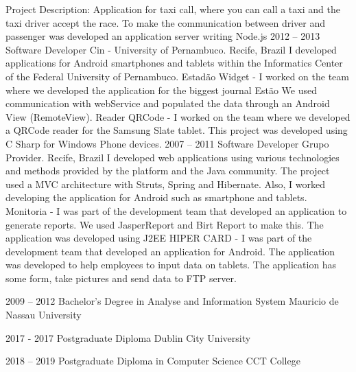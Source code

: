 \documentclass[9pt]{developercv} %
\begin{document}
\begin{entrylist}
{Project Description:
Application for taxi call, where you can call a taxi and the taxi driver accept the race. To make the communication between driver and passenger was developed an application server writing Node.js}
\entry
		{2012 -- 2013}
		{Software Developer}
		{Cin - University of Pernambuco. Recife, Brazil}
		{I developed applications for Android smartphones and tablets within the Informatics Center of the Federal University of Pernambuco.
\newline
\newline
Estadão Widget - I worked on the team where we developed the application for the biggest journal Estão We used communication with webService and populated the data through an Android View (RemoteView).
\newline
\newline
Reader QRCode - I worked on the team where we developed a QRCode reader for the Samsung Slate tablet. This project was developed using C Sharp for Windows Phone devices.}
\entry
		{2007 -- 2011}
		{Software Developer}
		{Grupo Provider. Recife, Brazil}
		{I developed web applications using various technologies and methods provided by the platform and the Java community. The project used a MVC architecture with Struts, Spring and Hibernate. Also, I worked developing the application for Android such as smartphone and tablets.
\newline
\newline
Monitoria - I was part of the development team that developed an application to generate reports. We used JasperReport and Birt Report to make this. The application was developed using J2EE
\newline
\newline
HIPER CARD - I was part of the development team that developed an application for Android. The application was developed to help employees to input data on tablets. The application has some form, take pictures and send data to FTP server.}
\end{entrylist}



\begin{entrylist}
	\entry
		{2009 -- 2012}
		{Bachelor's Degree in  Analyse and Information System}
		{Mauricio de Nassau University}
		
	\entry
		{2017 - 2017}
		{Postgraduate Diploma}
		{Dublin City University}
		
	\entry
		{2018 -- 2019}
		{Postgraduate Diploma in Computer Science}
		{CCT College}
		
\end{entrylist}
\end{document}

